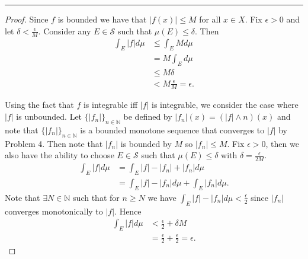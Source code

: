\documentclass[leqno]{article}
\theoremstyle{nonumberplain}
\newtheorem{proof}{Proof}
\newcommand{\N}{\mathbb{N}}
\newcommand{\Sets}{\mathcal{S}}
\begin{document}
\noindent\rule[0.5ex]{\linewidth}{1pt}

\begin{proof}
Since $f$ is bounded we have that $|f(x)|\leq M$ for all $x \in X$. Fix $\epsilon>0$ and let $\delta<\frac{\epsilon}{M}$. Consider any $E\in \Sets$ such that $\mu(E)\leq \delta$. Then
\begin{align*}
\int_E |f|d\mu &\leq \int_E M d\mu\\
&= M \int_E d\mu\\
&\leq M \delta\\
&< M\frac{\epsilon}{M}=\epsilon.
\end{align*}

Using the fact that $f$ is integrable iff $|f|$ is integrable, we consider the case where $|f|$ is unbounded. Let $\{|f_n|\}_{n\in \N}$ be defined by $|f_n|(x)=(|f|\wedge n)(x)$ and note that $\{|f_n|\}_{n\in \N}$ is a bounded monotone sequence that converges to $|f|$ by Problem 4. Then note that $|f_n|$ is bounded by $M$ so $|f_n|\leq M$.  Fix $\epsilon>0$, then we also have the ability to choose $E\in \Sets$ such that $\mu(E)\leq \delta$ with $\delta=\frac{\epsilon}{2M}$. 
\begin{align*}
\int_E |f| d\mu &= \int_E |f|-|f_n|+|f_n|d\mu\\
&=\int_E |f|-|f_n|d\mu + \int_E |f_n|d\mu.
\end{align*}
Note that $\exists N\in \N$ such that for $n\geq N$ we have $\int_E |f|-|f_n|d\mu<\frac{\epsilon}{2}$ since $|f_n|$ converges monotonically to $|f|$. Hence
\begin{align*}
\int_E |f|d\mu &<\frac{\epsilon}{2}+\delta M\\
&= \frac{\epsilon}{2}+\frac{\epsilon}{2}=\epsilon.
\end{align*}
\end{proof}

\pagebreak
\end{document}
